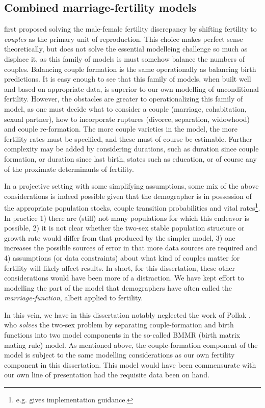 \subsection{Combined marriage-fertility models} 
\citet{karmel1947relations}
first proposed solving the male-female fertility discrepancy by shifting
fertility to \textit{couples} as the primary unit of reproduction. This choice
makes perfect sense theoretically, but does not solve the essential modelleing
challenge so much as displace it, as this family of models is
must somehow balance the numbers of couples. Balancing couple formation is the
same operationally as balancing birth predictions. It is easy enough to see that
this family of models, when built well and based on appropriate data, is
superior to our own modelling of unconditional fertility. However, the
obstacles are greater to operationalizing this family of model, as one must
decide what to consider a couple (marriage, cohabitation, sexual
partner), how to incorporate ruptures (divorce, separation, widowhood) and
couple re-formation. The more couple varieties in the model, the more fertility
rates must be specified, and these must of course be estimable. Further
complexity may be added by considering durations, such as duration since 
couple formation, or duration since last birth, states such as
education, or of course any of the proximate determinants of
fertility\citep{bongaarts1982fertility, bongaarts1978framework,
bongaarts1983fertility}. 

In a projective setting with some simplifying assumptions, some mix of the above
considerations is indeed possible given that the demographer is in possession of
the appropriate population stocks, couple transition probabilities and
vital rates\footnote{e.g. \citep{schoen1987modeling} gives implementation
guidance.}. In practice 1) there are (still) not many populations for which this
endeavor is possible, 2) it is not clear whether the two-sex stable population
structure or growth rate would differ from that produced by the simpler model,
3) one increases the possible sources of error in that more data sources are
required and 4) assumptions (or data constraints) about what kind of couples
matter for fertility will likely affect results. In short, for this
dissertation, these other considerations would have been more of a distraction.
We have kept effort to modelling the part of the model that demographers have
often called the \textit{marriage-function}, albeit applied to fertility.

In this vein, we have in this dissertation notably neglected the work of Pollak
\citep{pollak1986reformulation, pollak1987two, pollak1990two}, who
\textit{solves} the two-sex problem by separating couple-formation and birth
functions into two model components in the so-called BMMR (birth matrix mating
rule) model. As mentioned above, the couple-formation component of the model is
subject to the same modelling considerations as our own fertility component in
this dissertation. This model would have been commensurate with our own line of
presentation had the requisite data been on hand.

